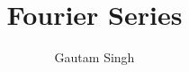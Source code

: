 \documentclass[journal,12pt,twocolumn]{IEEEtran}
\begin{document}
\let\StandardTheFigure\thefigure
\renewcommand{\thefigure}{\theproblem}



\def\putbox#1#2#3{\makebox[0in][l]{\makebox[#1][l]{}\raisebox{\baselineskip}[0in][0in]{\raisebox{#2}[0in][0in]{#3}}}}
     \def\rightbox#1{\makebox[0in][r]{#1}}
     \def\centbox#1{\makebox[0in]{#1}}
     \def\topbox#1{\raisebox{-\baselineskip}[0in][0in]{#1}}
     \def\midbox#1{\raisebox{-0.5\baselineskip}[0in][0in]{#1}}

\vspace{3cm}

\title{ 
Fourier Series
}


%
%
%

\author{Gautam Singh}
% 
%
\end{document}
